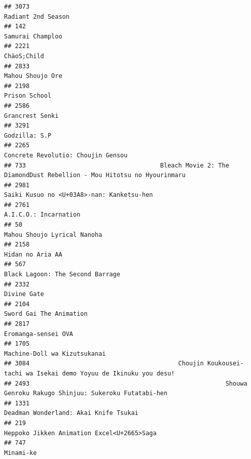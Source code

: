 \documentclass[
]{article}
\begin{document}
\begin{verbatim}
## 3073                                                                                        Radiant 2nd Season
## 142                                                                                           Samurai Champloo
## 2221                                                                                               ChäoS;Child
## 2833                                                                                          Mahou Shoujo Ore
## 2198                                                                                             Prison School
## 2586                                                                                           Grancrest Senki
## 3291                                                                                             Godzilla: S.P
## 2265                                                                        Concrete Revolutio: Choujin Gensou
## 733                                     Bleach Movie 2: The DiamondDust Rebellion - Mou Hitotsu no Hyourinmaru
## 2981                                                                 Saiki Kusuo no <U+03A8>-nan: Kanketsu-hen
## 2761                                                                                     A.I.C.O.: Incarnation
## 50                                                                                 Mahou Shoujo Lyrical Nanoha
## 2158                                                                                          Hidan no Aria AA
## 567                                                                           Black Lagoon: The Second Barrage
## 2332                                                                                               Divine Gate
## 2104                                                                                   Sword Gai The Animation
## 2817                                                                                       Eromanga-sensei OVA
## 1705                                                                              Machine-Doll wa Kizutsukanai
## 3084                                         Choujin Koukousei-tachi wa Isekai demo Yoyuu de Ikinuku you desu!
## 2493                                                      Shouwa Genroku Rakugo Shinjuu: Sukeroku Futatabi-hen
## 1331                                                                     Deadman Wonderland: Akai Knife Tsukai
## 219                                                                 Heppoko Jikken Animation Excel<U+2665>Saga
## 747                                                                                                  Minami-ke

\end{verbatim}
\end{document}
